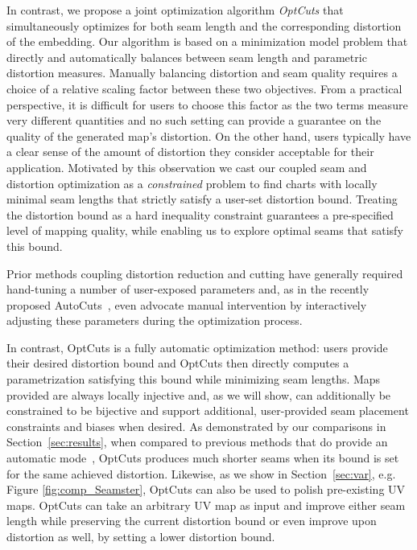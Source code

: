 In contrast, we propose a joint optimization algorithm {\em OptCuts} that simultaneously optimizes for both seam length and the corresponding distortion of the embedding.
Our algorithm is based on a minimization model problem that directly and automatically balances between seam length and parametric distortion measures. Manually balancing distortion and seam quality requires a choice of a relative scaling factor between these two objectives. From a practical perspective, it is difficult for users to choose this factor as the two terms measure very different quantities and no such setting can provide a guarantee on the quality of the generated map's distortion. 
On the other hand, users typically have a clear sense of the amount of distortion they consider acceptable for their application. Motivated by this observation we cast our coupled seam and distortion optimization as a \emph{constrained} problem to find charts with locally minimal seam lengths that strictly satisfy a user-set distortion bound. Treating the distortion bound as a hard inequality constraint guarantees a pre-specified level of mapping quality, while enabling us to explore optimal seams that satisfy this bound. %

Prior methods coupling distortion reduction and cutting have generally required hand-tuning a number of user-exposed parameters and, as in the recently proposed AutoCuts~\cite{Poranne2017Autocuts}, even advocate manual intervention by interactively adjusting these parameters during the optimization process.

In contrast, OptCuts is a fully automatic optimization method: users provide their desired distortion bound and OptCuts then directly computes a parametrization satisfying this bound while minimizing seam lengths. Maps provided are always locally injective and, as we will show, can additionally be constrained to be bijective and support additional, user-provided seam placement constraints and biases when desired. 
As demonstrated by our comparisons in Section~\ref{sec:results},
when compared to previous methods that do provide an automatic mode~\cite{BoundedDistortParam:2002,Poranne2017Autocuts}, OptCuts produces much shorter seams when its bound is set for the same achieved distortion. 
Likewise, as we show in Section~\ref{sec:var}, e.g. Figure \ref{fig:comp_Seamster}, OptCuts can also be used to polish pre-existing UV maps. 
OptCuts can take an arbitrary UV map as input and improve either seam length while preserving the current distortion bound or even improve upon distortion as well, by setting a lower distortion bound.

